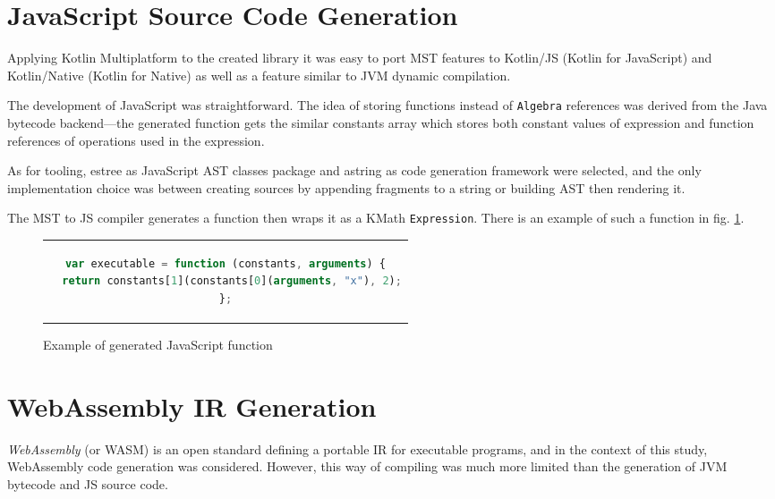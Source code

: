 \documentclass[conference]{IEEEtran}
\begin{document}
\section{JavaScript Source Code Generation}

Applying Kotlin Multiplatform to the created library it was easy to port MST features to Kotlin/JS (Kotlin for JavaScript) and Kotlin/Native (Kotlin for Native) as well as a feature similar to JVM dynamic compilation.

The development of JavaScript was straightforward. The idea of storing functions instead of \texttt{Algebra} references was derived from the Java bytecode backend---the generated function gets the similar constants array which stores both constant values of expression and function references of operations used in the expression.

As for tooling, estree \cite{estree} as JavaScript AST classes package and astring \cite{astring} as code generation framework were selected, and the only implementation choice was between creating sources by appending fragments to a string or building AST then rendering it.

The MST to JS compiler generates a function then wraps it as a KMath \texttt{Expression}. There is an example of such a function in fig. \ref{ls3}.

\begin{figure}[ht]
    \begin{center}
    \begin{tabular}{c}
    \begin{lstlisting}[language=JavaScript]
var executable = function (constants, arguments) {
  return constants[1](constants[0](arguments, "x"), 2);
};
    \end{lstlisting}
    \end{tabular}
    \end{center}
    \caption{Example of generated JavaScript function}\label{ls3}
\end{figure}

\section{WebAssembly IR Generation}
\textit{WebAssembly} (or WASM) \cite{wasm} is an open standard defining a portable IR for executable programs, and in the context of this study, WebAssembly code generation was considered. However, this way of compiling was much more limited than the generation of JVM bytecode and JS source code.
\end{document}

